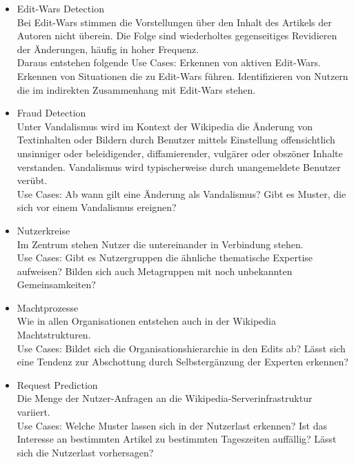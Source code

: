 \begin{itemize}
    \item Edit-Wars Detection\\ Bei Edit-Wars stimmen die Vorstellungen über den Inhalt des Artikels der Autoren nicht überein. Die Folge sind wiederholtes gegenseitiges Revidieren der Änderungen, häufig in hoher Frequenz.\cite{wikipediaprob.}\\ Daraus entstehen folgende Use Cases: Erkennen von aktiven Edit-Wars. Erkennen von Situationen die zu Edit-Wars führen. Identifizieren von Nutzern die im indirekten Zusammenhang mit Edit-Wars stehen.
    \item Fraud Detection\\Unter Vandalismus wird im Kontext der Wikipedia die Änderung von Textinhalten oder Bildern durch Benutzer mittels Einstellung offensichtlich unsinniger oder beleidigender, diffamierender, vulgärer oder obszöner Inhalte verstanden. Vandalismus wird typischerweise durch unangemeldete Benutzer verübt.\cite{wikipediaprob.} \\Use Cases: Ab wann gilt eine Änderung als Vandalismus? Gibt es Muster, die sich vor einem Vandalismus ereignen? 
    \item Nutzerkreise\\Im Zentrum stehen Nutzer die untereinander in Verbindung stehen.\\Use Cases: Gibt es Nutzergruppen die ähnliche thematische Expertise aufweisen? Bilden sich auch Metagruppen mit noch unbekannten Gemeinsamkeiten?
    \item Machtprozesse\\Wie in allen Organisationen entstehen auch in der Wikipedia Machtstrukturen.\\Use Cases: Bildet sich die Organisationshierarchie in den Edits ab? Lässt sich eine Tendenz zur Abschottung durch Selbstergänzung der Experten erkennen?\cite{wikipedia.}
    \item Request Prediction\\Die Menge der Nutzer-Anfragen an die Wikipedia-Serverinfrastruktur variiert.\\Use Cases: Welche Muster lassen sich in der Nutzerlast erkennen? Ist das Interesse an bestimmten Artikel zu bestimmten Tageszeiten auffällig? Lässt sich die Nutzerlast vorhersagen?
\end{itemize}
